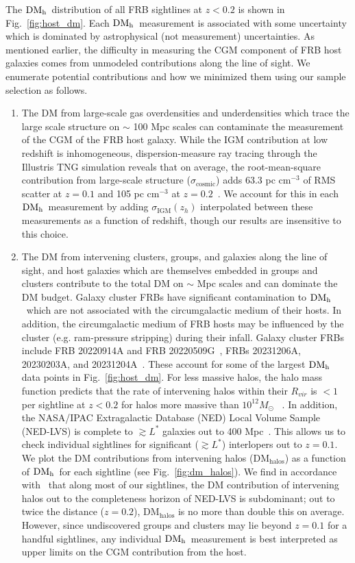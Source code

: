 \documentclass[twocolumn]{aastex631}
\newcommand{\dmh}{\ensuremath{{\rm DM}_\textrm{h}}}
\begin{document}
The \dmh\ distribution of all FRB sightlines at $z < 0.2$ is shown in Fig.~\ref{fig:host_dm}. Each \dmh\ measurement is associated with some uncertainty which is dominated by astrophysical (not measurement) uncertainties. As mentioned earlier, the difficulty in measuring the CGM component of FRB host galaxies comes from unmodeled contributions along the line of sight. We enumerate potential contributions and how we minimized them using our sample selection as follows.
\begin{enumerate}
    \item The DM from large-scale gas overdensities and underdensities which trace the large scale structure on $\sim$ 100 Mpc scales can contaminate the measurement of the CGM of the FRB host galaxy. While the IGM contribution at low redshift is inhomogeneous, dispersion-measure ray tracing through the Illustris TNG simulation reveals that on average, the root-mean-square contribution from large-scale structure ($\sigma_\textrm{cosmic}$) adds 63.3 pc cm$^{-3}$ of RMS scatter at $z = 0.1$ and 105 pc cm$^{-3}$ at $z = 0.2$~\citep{walker2024dispersion}. We account for this in each \dmh\ measurement by adding $\sigma_\textrm{IGM}(z_h)$ interpolated between these measurements as a function of redshift, though our results are insensitive to this choice.
    \item The DM from intervening clusters, groups, and galaxies along the line of sight, and host galaxies which are themselves embedded in groups and clusters contribute to the total DM on $\sim$ Mpc scales and can dominate the DM budget. Galaxy cluster FRBs have significant contamination to \dmh\ which are not associated with the circumgalactic medium of their hosts. In addition, the circumgalactic medium of FRB hosts may be influenced by the cluster (e.g. ram-pressure stripping) during their infall. Galaxy cluster FRBs include FRB 20220914A and FRB 20220509G~\citep{connor2023deep}, FRBs 20231206A, 20230203A, and 20231204A~\citep{chime2024catalog}. These account for some of the largest $\dmh$ data points in Fig.~\ref{fig:host_dm}. For less massive halos, the halo mass function predicts that the rate of intervening halos within their $R_{vir}$ is $< 1$ per sightline at $z < 0.2$ for halos more massive than $10^{12} M_\odot$ ~\citep{mcquinn2014locating}. In addition, the NASA/IPAC Extragalactic Database (NED) Local Volume Sample (NED-LVS) is complete to $\gtrsim L^*$ galaxies out to 400 Mpc~\citep{cook2023completeness}. This allows us to check individual sightlines for significant ($\gtrsim L^*$) interlopers out to $z = 0.1$. We plot the DM contributions from intervening halos (DM$_\mathrm{halos}$) as a function of \dmh\ for each sightline (see Fig.~\ref{fig:dm_halos}). We find in accordance with~\citep{mcquinn2014locating} that along most of our sightlines, the DM contribution of intervening halos out to the completeness horizon of NED-LVS is subdominant; out to twice the distance ($z = 0.2$), DM$_\mathrm{halos}$ is no more than double this on average. However, since undiscovered groups and clusters may lie beyond $z = 0.1$ for a handful sightlines, any individual \dmh\ measurement is best interpreted as upper limits on the CGM contribution from the host.

\end{enumerate}
\end{document}
